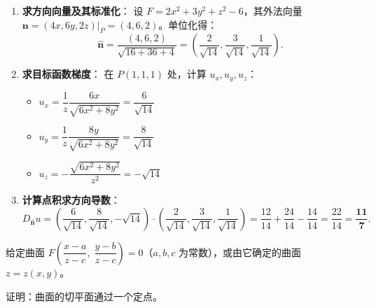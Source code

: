 \documentclass[lang=cn,11pt]{elegantbook}
\begin{document}
\begin{solution}
\begin{enumerate}
  \item \textbf{求方向向量及其标准化}：
  设 $F = 2x^2+3y^2+z^2-6$，其外法向量 $\boldsymbol n = (4x, 6y, 2z)|_P = (4, 6, 2)$。单位化得：
  \[
  \hat{\boldsymbol n} = \frac{(4, 6, 2)}{\sqrt{16+36+4}} = \left(\frac{2}{\sqrt{14}}, \frac{3}{\sqrt{14}}, \frac{1}{\sqrt{14}}\right).
  \]
  \item \textbf{求目标函数梯度}：
  在 $P(1,1,1)$ 处，计算 $u_x, u_y, u_z$：
  \begin{itemize}
    \item $u_x = \dfrac{1}{z}\dfrac{6x}{\sqrt{6x^2+8y^2}} = \dfrac{6}{\sqrt{14}}$
    \item $u_y = \dfrac{1}{z}\dfrac{8y}{\sqrt{6x^2+8y^2}} = \dfrac{8}{\sqrt{14}}$
    \item $u_z = -\dfrac{\sqrt{6x^2+8y^2}}{z^2} = -\sqrt{14}$
  \end{itemize}
  \item \textbf{计算点积求方向导数}：
  \[
  D_{\hat{\boldsymbol n}} u = \left(\frac{6}{\sqrt{14}}, \frac{8}{\sqrt{14}}, -\sqrt{14}\right) \cdot \left(\frac{2}{\sqrt{14}}, \frac{3}{\sqrt{14}}, \frac{1}{\sqrt{14}}\right) = \frac{12}{14} + \frac{24}{14} - \frac{14}{14} = \frac{22}{14} = \mathbf{\frac{11}{7}}.
  \]
\end{enumerate}
\end{solution}


\begin{exercise}[平移变换下切平面过定点]
给定曲面 $F\!\left(\dfrac{x-a}{z-c},\;\dfrac{y-b}{z-c}\right)=0$（$a,b,c$ 为常数），或由它确定的曲面 $z=z(x,y)$。

证明：曲面的切平面通过一个定点。
\end{exercise}
\end{document}
